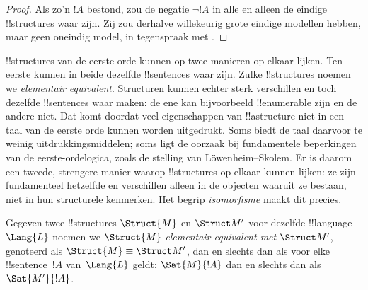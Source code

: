 \documentclass[openany]{memoir}
\begin{document}
\begin{proof}
Als zo'n $!A$ bestond, zou de negatie $\lnot !A$ in alle en alleen de
eindige !!{structure}s waar zijn. Zij zou derhalve willekeurig grote
eindige modellen hebben, maar geen oneindig model, in tegenspraak met
.
\end{proof}
\endgroup

\begingroup
\def\olfilename{OLP-0187}
\def\olfilepath{content/model-theory/basics/}
\hypertarget{unit-OLP-0187}{}




!!{structure}s van de eerste orde kunnen op twee manieren op elkaar
lijken. Ten eerste kunnen in beide dezelfde !!{sentence}s waar zijn.
Zulke !!{structure}s noemen we \emph{elementair equivalent}. Structuren
kunnen echter sterk verschillen en toch dezelfde !!{sentence}s waar
maken: de ene kan bijvoorbeeld !!{enumerable} zijn en de andere niet.
Dat komt doordat veel eigenschappen van !!a{structure} niet in een taal
van de eerste orde kunnen worden uitgedrukt. Soms biedt de taal daarvoor
te weinig uitdrukkingsmiddelen; soms ligt de oorzaak bij fundamentele
beperkingen van de eerste-ordelogica, zoals de stelling van
L\"owenheim--Skolem. Er is daarom een tweede, strengere manier waarop
!!{structure}s op elkaar kunnen lijken: ze zijn fundamenteel hetzelfde
en verschillen alleen in de objecten waaruit ze bestaan, niet in hun
structurele kenmerken. Het begrip \emph{isomorfisme} maakt dit precies.

\begin{defn}
Gegeven twee !!{structure}s $\Struct{M}$ en $\Struct M'$ voor dezelfde
!!{language}~$\Lang{L}$ noemen we $\Struct{M}$ \emph{elementair
  equivalent met} $\Struct M'$, genoteerd als $\Struct{M} \equiv \Struct M'$,
dan en slechts dan als voor elke !!{sentence}~$!A$ van~$\Lang{L}$ geldt:
$\Sat{M}{!A}$ dan en slechts dan als $\Sat{M'}{!A}$.
\end{defn}
\end{document}
